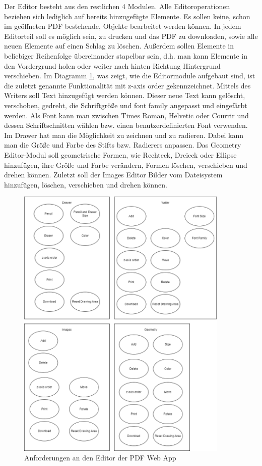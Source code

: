 Der Editor besteht aus den restlichen 4 Modulen. Alle Editoroperationen beziehen sich lediglich auf bereits hinzugefügte Elemente. Es sollen keine, schon im geöffneten PDF bestehende, Objekte bearbeitet werden können. In jedem Editorteil soll es möglich sein, zu drucken und das PDF zu downloaden, sowie alle neuen Elemente auf einen Schlag zu löschen. Außerdem sollen Elemente in beliebiger Reihenfolge übereinander stapelbar sein, d.h. man kann Elemente in den Vordergrund holen oder weiter nach hinten Richtung Hintergrund verschieben. Im Diagramm \ref{fig:editor}, was zeigt, wie die Editormodule aufgebaut sind, ist die zuletzt genannte Funktionalität mit z-axis order gekennzeichnet. Mittels des Writers soll Text hinzugefügt werden können. Dieser neue Text kann gelöscht, verschoben, gedreht, die Schriftgröße und font family angepasst und eingefärbt werden. Als Font kann man zwischen Times Roman, Helvetic oder Courrir und dessen Schriftschnitten wählen bzw. einen benutzerdefinierten Font verwenden. Im Drawer hat man die Möglichkeit zu zeichnen und zu radieren. Dabei kann man die Größe und Farbe des Stifts bzw. Radierers anpassen. Das Geometry Editor-Modul soll geometrische Formen, wie Rechteck, Dreieck oder Ellipse hinzufügen, ihre Größe und Farbe verändern, Formen löschen, verschieben und drehen können. Zuletzt soll der Images Editor Bilder vom Dateisystem hinzufügen, löschen, verschieben und drehen können.


\begin{figure}[!htbp]
	\centering
	\includegraphics[width=0.9\textwidth]{"images/editor-funktionen-anforderungen.png"}
	\caption{Anforderungen an den Editor der PDF Web App}
	\label{fig:editor}
\end{figure}


